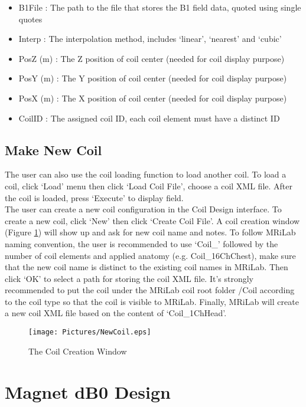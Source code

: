 \documentclass{book}%
\begin{document}
\begin{itemize}
	\item B1File : The path to the file that stores the B1 field data, quoted using single quotes
	\item Interp : The interpolation method, includes `linear', `nearest' and `cubic'
	\item PosZ (m) : The Z position of coil center (needed for coil display purpose)
  \item PosY (m) : The Y position of coil center (needed for coil display purpose)
	\item PosX (m) : The X position of coil center (needed for coil display purpose)
	\item CoilID : The assigned coil ID, each coil element must have a distinct ID
\end{itemize}

\subsection{Make New Coil}

The user can also use the coil loading function to load another coil. To load a coil, click `Load' menu then click `Load Coil File', choose a coil XML file. After the coil is loaded, press `Execute' to display field.\\

The user can create a new coil configuration in the Coil Design interface. To create a new coil, click `New' then click `Create Coil File'. A coil creation window (Figure \ref{fig:NewCoil}) will show up and ask for new coil name and notes. To follow MRiLab naming convention, the user is recommended to use `Coil\_' followed by the number of coil elements and applied anatomy (e.g. Coil\_16ChChest), make sure that the new coil name is distinct to the existing coil names in MRiLab. Then click `OK' to select a path for storing the coil XML file. It's strongly recommended to put the coil under the MRiLab coil root folder /Coil according to the coil type so that the coil is visible to MRiLab. Finally, MRiLab will create a new coil XML file based on the content of `Coil\_1ChHead'.

\begin{figure}[htbp]
	\centering
		\texttt{[image: Pictures/NewCoil.eps]}
	\caption{The Coil Creation Window}
	\label{fig:NewCoil}
\end{figure}


\section{Magnet dB0 Design}
\end{document}
